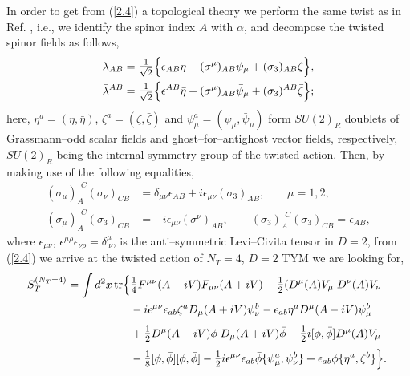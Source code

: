 \documentclass[a4paper,11pt]{article}
\begin{document}
In order to get from (\ref{2.4}) a topological theory we perform the same
twist as in Ref. \cite{1}, i.e., we identify the spinor index $A$ with 
$\alpha$, and decompose the twisted spinor fields as follows,
\begin{align*}
\lambda_{AB} &= \hbox{\large$\frac{1}{\sqrt{2}}$} \Bigr\{ 
\epsilon_{AB} \eta + 
(\sigma^\mu)_{AB} \psi_\mu + (\sigma_3)_{AB} \zeta \Bigr\},
\\
\bar{\lambda}^{AB} &= \hbox{\large$\frac{1}{\sqrt{2}}$} \Bigr\{
\epsilon^{AB} \bar{\eta} + 
(\sigma^\mu)_{AB} \bar{\psi}_\mu + (\sigma_3)^{AB} \bar{\zeta} \Bigr\};
\end{align*}
here, $\eta^a = (\eta, \bar{\eta})$, 
$\zeta^a = (\zeta, \bar{\zeta})$ and
$\psi_\mu^a = (\psi_\mu, \bar{\psi}_\mu)$ form $SU(2)_R$ doublets of
Grassmann--odd scalar fields and ghost--for--antighost vector fields,
respectively, $SU(2)_R$ being the internal symmetry group of the twisted 
action. Then, by making use of the following equalities, 
\begin{align*}
(\sigma_\mu)_A^{\!~~C} (\sigma_\nu)_{CB} &= 
\delta_{\mu\nu} \epsilon_{AB} + i \epsilon_{\mu\nu} (\sigma_3)_{AB},
\qquad
\mu = 1,2,
\\
(\sigma_\mu)_A^{\!~~C} (\sigma_3)_{CB} &= 
- i \epsilon_{\mu\nu} (\sigma^\nu)_{AB},
\qquad
(\sigma_3)_A^{\!~~C} (\sigma_3)_{CB} = \epsilon_{AB},
\end{align*}
where $\epsilon_{\mu\nu}$, $\epsilon^{\mu\rho} \epsilon_{\nu\rho} = 
\delta^\mu_{~\nu}$, is the anti--symmetric Levi--Civita tensor in $D = 2$, 
from (\ref{2.4}) we arrive at the twisted action of $N_T = 4$, $D = 2$ TYM 
we are looking for,
\begin{align}
\label{2.5}
S_T^{(N_T = 4)} = \int d^2x\, {\rm tr} \Bigr\{&
\hbox{\large$\frac{1}{4}$} F^{\mu\nu}(A - i V) F_{\mu\nu}(A + i V) + 
\hbox{\large$\frac{1}{2}$} (D^\mu(A) V_\mu \; D^\nu(A) V_\nu
\nonumber
\\
& - i \epsilon^{\mu\nu} \epsilon_{ab} \zeta^a D_\mu(A + i V) \psi_\nu^b - 
\epsilon_{ab} \eta^a D^\mu(A - i V) \psi_\mu^b
\nonumber
\\
& + \hbox{\large$\frac{1}{2}$} D^\mu(A - i V) \phi\; D_\mu(A + i V) \bar{\phi} -
\hbox{\large$\frac{1}{2}$} i [ \phi, \bar{\phi} ] D^\mu(A) V_\mu
\phantom{\frac{1}{2}}
\nonumber
\\
& - \hbox{\large$\frac{1}{8}$} [ \phi, \bar{\phi} ] [ \phi, \bar{\phi} ] -
\hbox{\large$\frac{1}{2}$} i \epsilon^{\mu\nu} 
\epsilon_{ab} \bar{\phi} \{ \psi_\mu^a, \psi_\nu^b \} +
\epsilon_{ab} \phi \{ \eta^a, \zeta^b \} \Bigr\}.
\end{align}
\end{document}
